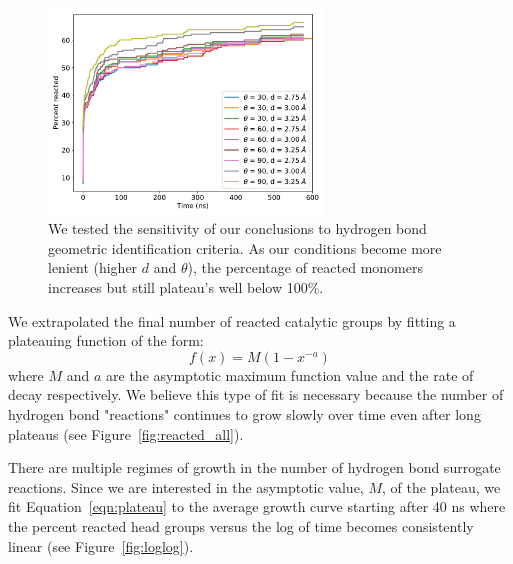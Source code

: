 \documentclass{article}
\begin{document}
  \begin{figure}
  \centering
  \includegraphics[width=0.65\textwidth]{sensitivity.pdf}
  \caption{We tested the sensitivity of our conclusions to hydrogen bond
  geometric identification criteria. As our conditions become more lenient
  (higher $d$ and $\theta$), the percentage of reacted monomers increases
  but still plateau's well below 100\%.}\label{fig:sensitivity}
  \end{figure}  
  
  We extrapolated the final number of reacted catalytic groups by fitting a
  plateauing function of the form:
  \begin{equation}
  f(x) = M(1 - x^{-a})
  \label{eqn:plateau}
  \end{equation}
  where $M$ and $a$ are the asymptotic maximum function value and the rate of
  decay respectively. We believe this type of fit is necessary because the 
  number of hydrogen bond "reactions" continues to grow slowly over time even
  after long plateaus (see Figure~\ref{fig:reacted_all}).
  
  There are multiple regimes of growth in the number of hydrogen bond surrogate
  reactions. Since we are interested in the asymptotic value, $M$, of the plateau,
  we fit Equation~\ref{eqn:plateau} to the average growth curve starting after
  40 ns where the percent reacted head groups versus the log of time becomes
  consistently linear (see Figure~\ref{fig:loglog}).
  
  
\end{document}
